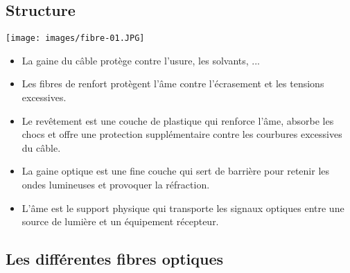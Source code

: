 \documentclass[a4paper]{article}
\begin{document}
\subsection{Structure}



\begin{center}
    \texttt{[image: images/fibre-01.JPG]}
\end{center}
\begin{itemize}
    \item La gaine du câble protège contre l'usure, les solvants, ...
    \item Les fibres de renfort protègent l’âme contre l’écrasement et les tensions excessives.
    \item Le revêtement est une couche de plastique qui renforce l’âme, absorbe les chocs et offre une protection supplémentaire contre les courbures excessives du câble.
    \item La gaine optique est une fine couche qui sert de barrière pour retenir les ondes lumineuses et provoquer la réfraction.
    \item L'âme est le support physique qui transporte les signaux optiques entre une source de lumière et un équipement récepteur.
\end{itemize}





\subsection{Les différentes fibres optiques} %
\end{document}
